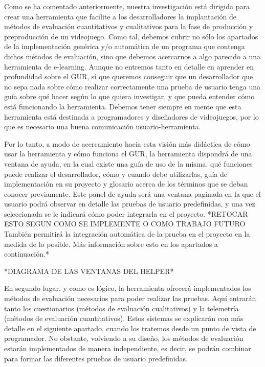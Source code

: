 Como se ha comentado anteriormente, nuestra investigación está dirigida para crear una herramienta que facilite a los desarrolladores la implantación de métodos de evaluación cuantitativos y cualitativos para la fase de producción y preproducción de un videojuego. Como tal, debemos cubrir no sólo los apartados de la implementación genérica y/o automática de un programa que contenga dichos métodos de evaluación, sino que debemos acercarnos a algo parecido a una herramienta de e-learning. Aunque no entremos tanto en detalle en aprender en profundidad sobre el GUR, sí que queremos conseguir que un desarrollador que no sepa nada sobre cómo realizar correctamente una prueba de usuario tenga una guía sobre qué hacer según lo que quiera investigar, y que pueda entender cómo está funcionando la herramienta. Debemos tener siempre en mente que esta herramienta está destinada a programadores y diseñadores de videojuegos, por lo que es necesario una buena comunicación usuario-herramienta. 

Por lo tanto, a modo de acercamiento hacia esta visión más didáctica de cómo usar la herramienta y cómo funciona el GUR, la herramienta dispondrá de una ventana de ayuda, en la cual existe una guía de uso de la misma: qué funciones puede realizar el desarrollador, cómo y cuando debe utilizarlas, guía de implementación en su proyecto y glosario acerca de los términos que se deban conocer previamente. Este panel de ayuda será una ventana paginada en la que el usuario podrá observar en detalle las pruebas de usuario predefinidas, y una vez seleccionada se le indicará cómo poder integrarla en el proyecto. *RETOCAR ESTO SEGUN COMO SE IMPLEMENTE O COMO TRABAJO FUTURO También permitirá la integración automática de la prueba en el proyecto en la medida de lo posible. Más información sobre esto en los apartados a continuación.*

*DIAGRAMA DE LAS VENTANAS DEL HELPER*

En segundo lugar, y como es lógico, la herramienta ofrecerá implementados los métodos de evaluación necesarios para poder realizar las pruebas. Aquí entrarán tanto los cuestionarios (métodos de evaluación cualitativos) y la telemetría (métodos de evaluación cuantitativos). Estos sistemas se explicarán con más detalle en el siguiente apartado, cuando los tratemos desde un punto de vista de programador. No obstante, volviendo a su diseño, los métodos de evaluación estarán implementados de manera independiente, es decir, se podrán combinar para formar las diferentes pruebas de usuario predefinidas.

